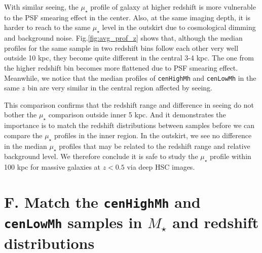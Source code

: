 \documentclass{emulateapj}
\def\rbcg{\texttt{cenHighMh}}
\def\nbcg{\texttt{cenLowMh}}
\def\mstar{{$M_{\star}$}}
\def\mden{{$\mu_{\star}$}}
\newcommand{\update}[1]{\textcolor{Bittersweet}{#1}}
\begin{document}
\begin{CJK*}{UTF8}{gbsn}
    \update{
    With similar seeing, the \mden{} profile of galaxy at higher redshift is more 
    vulnerable to the PSF smearing effect in the center. 
    Also, at the same imaging depth, it is harder to reach to the same \mden{} level
    in the outskirt due to cosmological dimming and background noise.  
    Fig.\ref{fig:avg_prof_z} shows that, although the median profiles for the same sample 
    in two redshift bins follow each other very well outside 10 kpc, they become quite
    different in the central 3-4 kpc. 
    The one from the higher redshift bin becomes more flattened due to PSF smearing 
    effect.  
    Meanwhile, we notice that the median profiles of \rbcg{} and \nbcg{} in the 
    same $z$ bin are very similar in the central region affected by seeing.   
    }
    
    \update{
    This comparison confirms that the redshift range and difference in seeing do not 
    bother the \mden{} comparison outside inner 5 kpc.
    And it demonstrates the importance is to match the redshift distributions between 
    samples before we can compare the \mden{} profiles in the inner region. 
    In the outskirt, we see no difference in the median \mden{} profiles that may be 
    related to the redshift range and relative background level. 
    We therefore conclude it is safe to study the \mden{} profile within 100 kpc for 
    massive galaxies at $z < 0.5$ via deep HSC images.
    }

\section{F. Match the \rbcg{} and \nbcg{} samples in \mstar{} and redshift distributions}
    \label{app:match}


\end{CJK*}
\end{document}
